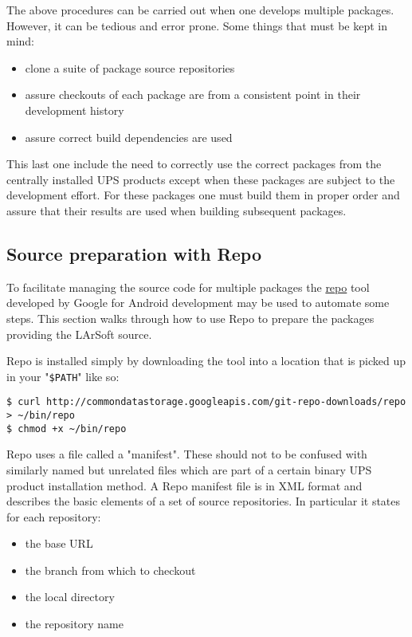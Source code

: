 \documentclass[11pt]{article}
\begin{document}
The above procedures can be carried out when one develops multiple packages.  However, it can be tedious and error prone.  Some things that must be kept in mind:

\begin{itemize}
\item clone a suite of package source repositories
\item assure checkouts of each package are from a consistent point in their development history
\item assure correct build dependencies are used
\end{itemize}

This last one include the need to correctly use the correct packages from the centrally installed UPS products except when these packages are subject to the development effort.  For these packages one must build them in proper order and assure that their results are used when building subsequent packages.

\subsection{Source preparation with Repo}
\label{sec-2-1}

To facilitate managing the source code for multiple packages the \href{https://code.google.com/p/git-repo/}{repo} tool developed by Google for Android development may be used to automate some steps.  This section walks through how to use Repo to prepare the packages providing the LArSoft source.

Repo is installed simply by downloading the tool into a location that is picked up in your "\texttt{\$PATH}" like so:

\begin{verbatim}
$ curl http://commondatastorage.googleapis.com/git-repo-downloads/repo > ~/bin/repo
$ chmod +x ~/bin/repo
\end{verbatim}

Repo uses a file called a "manifest".  These should not to be confused with similarly named but unrelated files which are part of a certain binary UPS product installation method.  A Repo manifest file is in XML format and describes the basic elements of a set of source repositories.  In particular it states for each repository:

\begin{itemize}
\item the base URL
\item the branch from which to checkout
\item the local directory
\item the repository name
\end{itemize}
\end{document}
